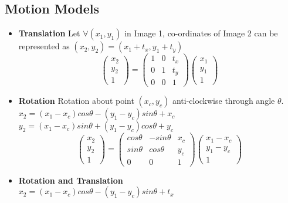 \documentclass{report}
\begin{document}
\subsection{Motion Models}
\begin{itemize}
    \item \textbf{Translation}
    Let $\forall (x_1, y_1)$ in Image 1, co-ordinates of Image 2 can be represented as $(x_2, y_2) = (x_1 + t_x, y_1 + t_y)$
    \[
        \begin{pmatrix}
            x_2\\
            y_2\\
            1
        \end{pmatrix}
        =
        \begin{pmatrix}
            1 & 0 & t_x\\
            0 & 1 & t_y\\
            0 & 0 & 1
        \end{pmatrix}
        \begin{pmatrix}
            x_1\\
            y_1\\
            1
        \end{pmatrix}
    \]
    \item \textbf{Rotation} Rotation about point $(x_c,y_c)$ anti-clockwise 
    through angle $\theta$.\\
    $ x_2 = (x_1 - x_c) cos\theta - (y_1 - y_c)sin\theta + x_c $\\
    $ y_2 = (x_1 - x_c) sin\theta + (y_1 - y_c)cos\theta + y_c $
    \[
    \begin{pmatrix}
        x_2\\
        y_2\\
        1
    \end{pmatrix}
    =
    \begin{pmatrix}
        cos\theta & -sin\theta & x_c\\
        sin\theta & cos\theta & y_c\\
        0 & 0 & 1
    \end{pmatrix}
    \begin{pmatrix}
        x_1 - x_c\\
        y_1 - y_c\\
        1
    \end{pmatrix}
    \]
    \item \textbf{Rotation and Translation}\\
    $ x_2 = (x_1 - x_c) cos\theta - (y_1 - y_c)sin\theta + t_x $\\

\end{itemize}
\end{document}

